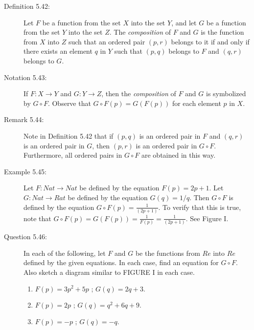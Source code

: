 \documentclass{book}
\begin{document}
\begin{description}
\item[Definition 5.42:] Let $F$ be a function from the set $X$ into the set $Y$, and let $G$ be a function from the set $Y$ into the set $Z$. The \emph{composition} of $F$ and $G$ is the function from $X$ into $Z$ such that an ordered pair $(p,r)$ belongs to it if and only if there exists an element $q$ in $Y$ such that $(p,q)$ belongs to $F$ and $(q,r)$ belongs to $G$.

\item[Notation 5.43:] If $F: X \rightarrow Y$ and $G: Y \rightarrow Z$, then the \emph{composition} of $F$ and $G$ is symbolized by $G \circ F$. Observe that $G \circ F(p) = G(F(p))$ for each element $p$ in $X$.

\item[Remark 5.44:] Note in Definition 5.42 that if $(p,q)$ is an ordered pair in $F$ and $(q,r)$ is an ordered pair in $G$, then $(p,r)$ is an ordered pair in $G \circ F$. Furthermore, all ordered pairs in $G \circ F$ are obtained in this way.

\item[Example 5.45:] Let $F: Nat \rightarrow Nat$ be defined by the equation $F(p) = 2p + 1$. Let $G: Nat \rightarrow Rat$ be defined by the equation $G(q) = 1/q$. Then $G \circ F$ is defined by the equation $G \circ F(p) = \frac{1}{(2p + 1)}$. To verify that this is true, note that $G \circ F(p) = G(F(p)) = \frac{1}{F(p)} = \frac{1}{(2p + 1)}$. See Figure I.

\item[Question 5.46:] In each of the following, let $F$ and $G$ be the functions from $Re$ into $Re$ defined by the given equations. In each case, find an equation for $G \circ F$. Also sketch a diagram similar to FIGURE I in each case.
\begin{enumerate}[\hspace{1cm}(a)]
  \item $F(p) = 3p^{2} + 5p$ ; $G(q) = 2q + 3$.
  \item $F(p) = 2p$ ; $G(q) = q^{2} + 6q + 9$.
  \item $F(p) = -p$ ; $G(q) = -q$.
\end{enumerate}


\end{description}
\end{document}
